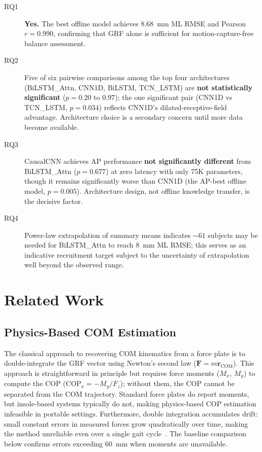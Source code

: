 \documentclass[preprint,12pt]{elsarticle}
\begin{document}
\begin{description}
  \item[RQ1] \textbf{Yes.} The best offline model achieves 8.68~mm ML RMSE and
        Pearson $r = 0.990$, confirming that GRF alone is sufficient for
        motion-capture-free balance assessment.
  \item[RQ2] Five of six pairwise comparisons among the top four architectures
        (BiLSTM\_Attn, CNN1D, BiLSTM, TCN\_LSTM) are \textbf{not statistically
        significant} ($p = 0.20$ to $0.97$); the one significant pair (CNN1D vs
        TCN\_LSTM, $p = 0.034$) reflects CNN1D's dilated-receptive-field advantage.
        Architecture choice is a secondary concern until more data become available.
  \item[RQ3] CausalCNN achieves AP performance \textbf{not significantly different}
        from BiLSTM\_Attn ($p = 0.677$) at zero latency with only 75K parameters,
        though it remains significantly worse than CNN1D (the AP-best offline model,
        $p = 0.005$). Architecture design, not offline knowledge transfer, is the
        decisive factor.
  \item[RQ4] Power-law extrapolation of summary means indicates ${\sim}61$ subjects
        may be needed for BiLSTM\_Attn to reach 8~mm ML RMSE; this serves as an
        indicative recruitment target subject to the uncertainty of extrapolation
        well beyond the observed range.
\end{description}

\section{Related Work}
\label{sec:related}

\subsection{Physics-Based COM Estimation}

The classical approach to recovering COM kinematics from a force plate is to
double-integrate the GRF vector using Newton's second law
($\mathbf{F} = m\ddot{\mathbf{r}}_\mathrm{COM}$).
This approach is straightforward in principle but requires force moments
($M_x$, $M_y$) to compute the COP ($\mathrm{COP}_x = -M_y / F_z$); without
them, the COP cannot be separated from the COM trajectory.
Standard force plates do report moments, but insole-based systems typically do not,
making physics-based COP estimation infeasible in portable settings.
Furthermore, double integration accumulates drift: small constant errors in
measured forces grow quadratically over time, making the method unreliable even
over a single gait cycle~\cite{labrozzi2024center}.
The baseline comparison below confirms errors exceeding 60~mm when moments are unavailable.
\end{document}
